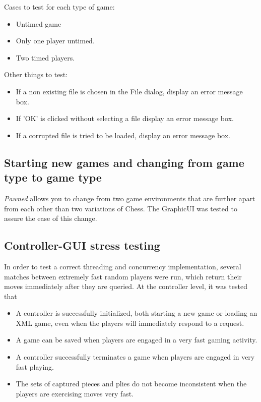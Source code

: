 			Cases to test for each type of game:
			\begin{itemize}
					\item Untimed game
					\item Only one player untimed.
					\item Two timed players.
				\end{itemize}
			
			Other things to test:			
			\begin{itemize}
					\item If a non existing file is chosen in the File dialog, display an 
								error message box.
					\item If 'OK' is clicked without selecting a file display an error message
								box.
					\item If a corrupted file is tried to be loaded, display an error message box.
				\end{itemize}


			\subsection{Starting new games and changing from game type to game type}
			
			\emph{Pawned} allows you to change from two game environments that are further 
			apart from each other than two variations of Chess. The GraphicUI was tested to 
			assure the ease of this change.		
	
	\subsection{Controller-GUI stress testing}
		In order to test a correct threading and concurrency implementation, several matches between extremely fast
		random players were run, which return their moves immediately after they are queried. At the controller level, 
		it was tested that 
		\begin{itemize}
			\item A controller is successfully initialized, both starting a new game or loading an XML game,
					  even when the players will immediately respond to a request. 
			\item A game can be saved when players are engaged in a very fast gaming activity.
			\item A controller successfully terminates a game when players are engaged in very fast playing.
			\item The sets of captured pieces and plies do not become inconsistent when the players 
						are exercising moves very fast.
		\end{itemize}
		
